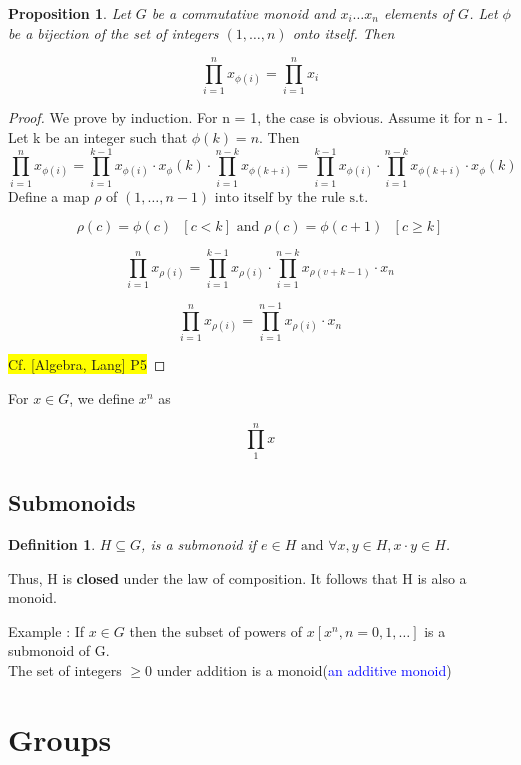 \documentclass[12pt]{article}
\newcommand{\mybox}[2][black]{\colorbox{#1}{#2}}
\newtheorem{definition}{Definition}
\newtheorem{proposition}{Proposition}
\begin{document}
\begin{proposition}
Let $G$ be a commutative monoid and $x_i \ldots x_n$ elements of $G$. Let $\phi$ be a bijection of the set of integers $(1, \ldots ,n)$ onto itself. Then 

\[\prod_{i = 1}^{n} x_{\phi(i)} = \prod_{i = 1}^{n}x_i\]
\end{proposition}
\begin{proof}
We prove by induction. For n = 1, the case is obvious. Assume it for n - 1. Let k be an integer such that $\phi(k)=n$. Then
\[  \prod_{i = 1}^{n} x_{\phi(i)} = \prod_{i = 1}^{k-1} x_{\phi(i)} \cdot x_\phi(k) \cdot \prod_{i = 1}^{n-k} x_{\phi(k+i)} = \prod_{i = 1}^{k-1} x_{\phi(i)} \cdot \prod_{i = 1}^{n-k} x_{\phi(k+i)} \cdot x_\phi(k) \]
Define a map $\rho$ of $(1, \ldots, n-1) \text{ into itself by the rule s.t.}$

\[ \rho(c) = \phi(c) \text{  }  [c < k]  \text{ and } \rho(c) = \phi(c+1) \text{  } [c \geq k]\]

\[\prod_{i = 1}^{n} x_{\rho(i)} = \prod_{i = 1}^{k-1} x_{\rho(i)} \cdot \prod_{i = 1}^{n-k} x_{\rho(v+k-1)} \cdot  x_{n} \]

\[\prod_{i = 1}^{n} x_{\rho(i)} = \prod_{i = 1}^{n-1} x_{\rho(i)} \cdot  x_{n} \]


\mybox[yellow]{Cf. [Algebra, Lang] P5} 
\end{proof}


\indent  \indent For $x \in G$, we define $x^{n}$ as 

\[ \prod_{1}^{n} x\]

\subsection{Submonoids}

\begin{definition}
$H \subseteq G$, is a submonoid if $e \in H \text{ and }\forall x, y \in H, x \cdot y \in H$.
\end{definition}
Thus, H is \textbf{closed} under the law of composition. It follows that H is also a monoid.

Example : If $x \in G$ then the subset of powers of $x [x^{n}, n = 0,1, \ldots ]$ is a submonoid of G.\\
The set of integers $\geq 0$ under addition is a monoid(\textcolor{blue}{an additive monoid})

\section{Groups}
\end{document}
